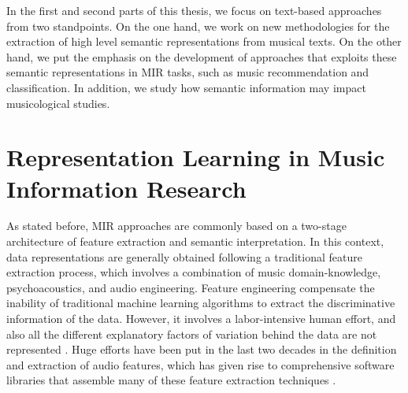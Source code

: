 
In the first and second parts of this thesis, we focus on text-based approaches from two standpoints. On the one hand, we work on new methodologies for the extraction of high level semantic representations from musical texts. On the other hand, we put the emphasis on the development of approaches that exploits these semantic representations in MIR tasks, such as music recommendation and classification. In addition, we study how semantic information may impact musicological studies.

\section{Representation Learning in Music Information Research}
\label{sec:intro:learning}

As stated before, MIR approaches are commonly based on a two-stage architecture of feature extraction and semantic interpretation. In this context, data representations are generally obtained following a traditional feature extraction process, which involves a combination of music domain-knowledge, psychoacoustics, and audio engineering. 
Feature engineering compensate the inability of traditional machine learning algorithms to extract the discriminative information of the data. However, it involves a labor-intensive human effort, and also all the different explanatory factors of variation behind the data are not represented \cite{bengio2013representation}. 
Huge efforts have been put in the last two decades in the definition and extraction of audio features, which has given rise to comprehensive software libraries that assemble many of these feature extraction techniques \cite{Essentia, Librosa}. 

